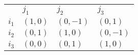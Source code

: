 \begin{center}
    \begin{tabular}{llll}
                                 & $j_1$    & $j_2$     & $j_3$                         \\ \cline{2-4}
    \multicolumn{1}{l|}{$i_1$}   & $(1, 0)$      & $(0, -1)$      & \multicolumn{1}{l|}{$(0, 1)$}  \\
    \multicolumn{1}{l|}{$i_2$}   & $(0, 1)$      & $(1, 0)$       & \multicolumn{1}{l|}{$(0, -1)$}  \\
    \multicolumn{1}{l|}{$i_3$}   & $(0, 0)$     & $(0, 1)$       & \multicolumn{1}{l|}{$(1, 0)$}  \\ \cline{2-4}
    \end{tabular}
\end{center}